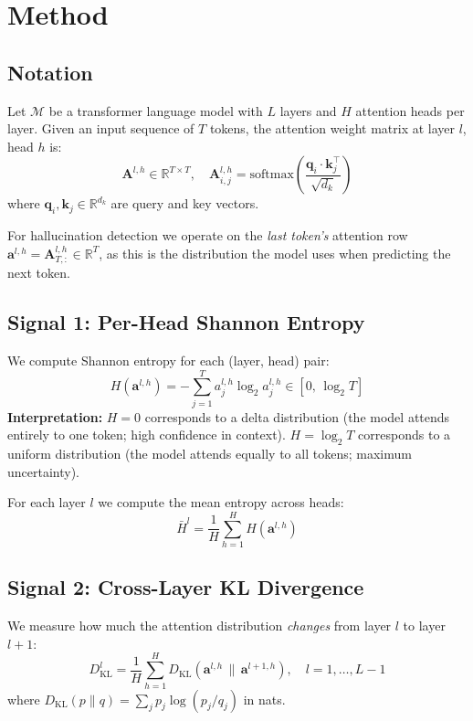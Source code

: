 \documentclass[11pt]{article}
\begin{document}
\section{Method}

\subsection{Notation}

Let $\mathcal{M}$ be a transformer language model with $L$ layers and $H$ 
attention heads per layer. Given an input sequence of $T$ tokens, the 
attention weight matrix at layer $l$, head $h$ is:
\[
  \mathbf{A}^{l,h} \in \mathbb{R}^{T \times T},
  \quad \mathbf{A}^{l,h}_{i,j} = \text{softmax}\!\left(\frac{\mathbf{q}_i \cdot \mathbf{k}_j^\top}{\sqrt{d_k}}\right)
\]
where $\mathbf{q}_i, \mathbf{k}_j \in \mathbb{R}^{d_k}$ are query and key vectors.

For hallucination detection we operate on the \emph{last token's} attention 
row $\mathbf{a}^{l,h} = \mathbf{A}^{l,h}_{T, :} \in \mathbb{R}^T$, 
as this is the distribution the model uses when predicting the next token.

\subsection{Signal 1: Per-Head Shannon Entropy}

We compute Shannon entropy for each (layer, head) pair:
\[
  H(\mathbf{a}^{l,h}) = -\sum_{j=1}^{T} a^{l,h}_j \log_2 a^{l,h}_j
  \in [0,\, \log_2 T]
\]
\textbf{Interpretation:}
$H = 0$ corresponds to a delta distribution (the model attends entirely 
to one token; high confidence in context). 
$H = \log_2 T$ corresponds to a uniform distribution (the model attends 
equally to all tokens; maximum uncertainty).

For each layer $l$ we compute the mean entropy across heads:
\[
  \bar{H}^l = \frac{1}{H} \sum_{h=1}^{H} H(\mathbf{a}^{l,h})
\]

\subsection{Signal 2: Cross-Layer KL Divergence}

We measure how much the attention distribution \emph{changes} from layer $l$ 
to layer $l+1$:
\[
  D_{\text{KL}}^l = \frac{1}{H} \sum_{h=1}^{H}
    D_{\text{KL}}\!\left(\mathbf{a}^{l,h} \,\|\, \mathbf{a}^{l+1,h}\right),
  \quad l = 1, \ldots, L-1
\]
where $D_{\text{KL}}(p \| q) = \sum_j p_j \log(p_j / q_j)$ in nats.
\end{document}
